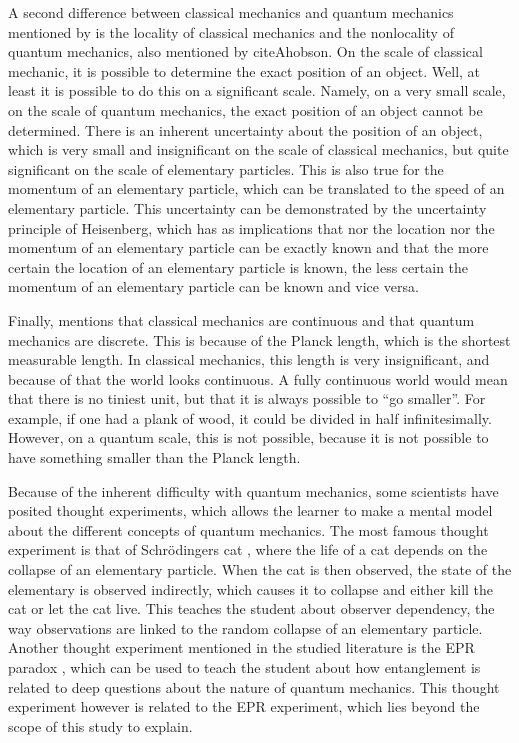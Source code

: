 \documentclass[11pt,twoside]{report} %
\begin{document}
A second difference between classical mechanics and quantum mechanics mentioned by  is the locality of classical mechanics and the nonlocality of quantum mechanics, also mentioned by citeA{hobson}. On the scale of classical mechanic, it is possible to determine the exact position of an object. Well, at least it is possible to do this on a significant scale. Namely, on a very small scale, on the scale of quantum mechanics, the exact position of an object  cannot be determined. There is an inherent uncertainty about the position of an object, which is very small and insignificant on the scale of classical mechanics, but quite significant on the scale of elementary particles. This is also true for the momentum of an elementary particle, which can be translated to the speed of an elementary particle. This uncertainty can be demonstrated by the uncertainty principle of Heisenberg, which has as implications that nor the location nor the momentum of an elementary particle can be exactly known and that the more certain the location of an elementary particle is known, the less certain the momentum of an elementary particle can be known and vice versa.

Finally,  mentions that classical mechanics are continuous and that quantum mechanics are discrete. This is because of the Planck length, which is the shortest measurable length. In classical mechanics, this length is very insignificant, and because of that the world looks continuous. A fully continuous world would mean that there is no tiniest unit, but that it is always possible to “go smaller”. For example, if one had a plank of wood, it could be divided in half infinitesimally. However, on a quantum scale, this is not possible, because it is not possible to have something smaller than the Planck length.

Because of the inherent difficulty with quantum mechanics, some scientists have posited thought experiments, which allows the learner to make a mental model about the different concepts of quantum mechanics. The most famous thought experiment is that of Schrödingers cat \cite{muller, velentzas}, where the life of a cat depends on the collapse of an elementary particle. When the cat is then observed, the state of the elementary is observed indirectly, which causes it to collapse and either kill the cat or let the cat live. This teaches the student about observer dependency, the way observations are linked to the random collapse of an elementary particle. Another thought experiment mentioned in the studied literature is the EPR paradox \cite{kuttner, muller, velentzas}, which can be used to teach the student about how entanglement is related to deep questions about the nature of quantum mechanics. This thought experiment however is related to the EPR experiment, which lies beyond the scope of this study to explain.
\end{document}
